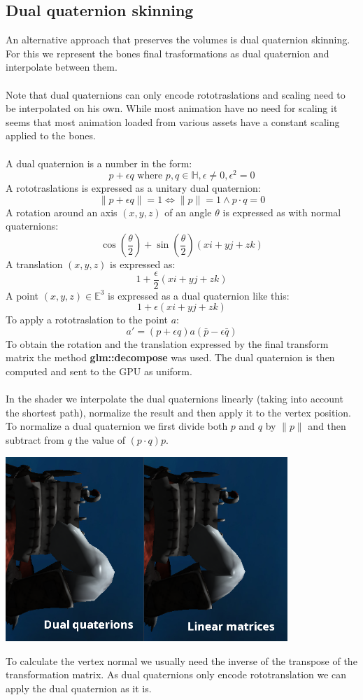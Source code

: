\documentclass[12pt, a4paper]{article}
\begin{document}
\subsection{Dual quaternion skinning}
An alternative approach that preserves the volumes is dual quaternion skinning. For this we represent the bones final trasformations as dual quaternion
and interpolate between them.\\\\
Note that dual quaternions can only encode rototraslations and scaling need to be interpolated on his own. While most animation have no need for scaling
it seems that most animation loaded from various assets have a constant scaling applied to the bones.\\\\
A dual quaternion is a number in the form:
\[
    p + \epsilon q \text{ where } p, q \in \mathbb{H},
    \epsilon \neq 0, \epsilon^2 = 0
\]
A rototraslations is expressed as a unitary dual quaternion:
\[
    \|p + \epsilon q\| = 1 \iff \|p\| = 1 \land p \cdot q = 0
\]
A rotation around an axis $(x, y, z)$ of an angle $\theta$ is expressed as with normal quaternions:
\[
    \cos\left(\frac{\theta}{2}\right)+\sin\left(\frac{\theta}{2}\right)(xi + yj + zk)
\]
A translation $(x, y, z)$ is expressed as:
\[
    1+\frac{\epsilon}{2}(xi + yj + zk)
\]
A point $(x, y, z) \in \mathbb{E}^3$ is expressed as a dual quaternion like this:
\[
    1 + \epsilon (xi +  yj +  zk)
\]
To apply a rototraslation to the point $a$:
\[
    a' = (p + \epsilon q)a(\bar{p} - \epsilon \bar{q})
\]
To obtain the rotation and the translation expressed by the final transform matrix the method \textbf{glm::decompose} was used.
The dual quaternion is then computed and sent to the GPU as uniform.\\\\
In the shader we interpolate the dual quaternions linearly (taking into account the shortest path), normalize the result and then apply it to the vertex position.
To normalize a dual quaternion we first divide both $p$ and $q$ by $\|p\|$ and then subtract from $q$ the value of $(p \cdot q)p$.
\begin{center}
    \centering
    \includegraphics[width=0.8\textwidth]{img/dq.png}
\end{center}
To calculate the vertex normal we usually need the inverse of the transpose of the transformation matrix. As dual quaternions only encode rototranslation
we can apply the dual quaternion as it is.
\end{document}

